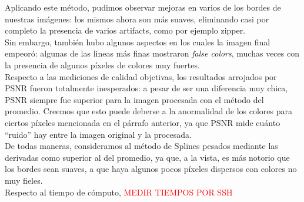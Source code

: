 \documentclass[a4paper]{article}
\begin{document}
\bigskip

Aplicando este método, pudimos observar mejoras en varios de los bordes de nuestras imágenes: los mismos ahora son más suaves, eliminando casi por completo la presencia de varios artifacts, como por ejemplo zipper.\\
\indent Sin embargo, también hubo algunos aspectos en los cuales la imagen final empeoró: algunas de las lineas más finas mostraron \textit{false colors}, muchas veces con la presencia de algunos píxeles de colores muy fuertes.\\

Respecto a las mediciones de calidad objetivas, los resultados arrojados por PSNR fueron totalmente inesperados: a pesar de ser una diferencia muy chica, PSNR siempre fue superior para la imagen procesada con el método del promedio. Creemos que esto puede deberse a la anormalidad de los colores para ciertos píxeles mencionada en el párrafo anterior, ya que PSNR mide cuánto ``ruido'' hay entre la imagen original y la procesada. \\

De todas maneras, consideramos al método de Splines pesados mediante las derivadas como superior al del promedio, ya que, a la vista, es más notorio que los bordes sean suaves, a que haya algunos pocos píxeles dispersos con colores no muy fieles. \\

Respecto al tiempo de cómputo, \textcolor{red}{MEDIR TIEMPOS POR SSH\\}
\end{document}
